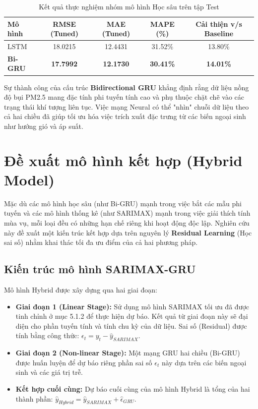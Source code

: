 \begin{table}[H]
    \centering
    \caption{Kết quả thực nghiệm nhóm mô hình Học sâu trên tập Test}
    \label{tab:dl_improvement}
    \begin{tabular}{|l|c|c|c|c|}
    \hline
    \textbf{Mô hình} & \textbf{RMSE (Tuned)} & \textbf{MAE (Tuned)} & \textbf{MAPE (\%)} & \textbf{Cải thiện v/s Baseline} \\ \hline
    LSTM             & 18.0215               & 12.4431              & 31.52\%            & 13.80\% \\
    \textbf{Bi-GRU}  & \textbf{17.7992}      & \textbf{12.1730}     & \textbf{30.41\%}   & \textbf{14.01\%} \\ \hline
    \end{tabular}
\end{table}

Sự thành công của cấu trúc \textbf{Bidirectional GRU} khẳng định rằng dữ liệu nồng độ bụi PM2.5 mang đặc tính phi tuyến tính cao và phụ thuộc chặt chẽ vào các trạng thái khí tượng liên tục. Việc mạng Neural có thể "nhìn" chuỗi dữ liệu theo cả hai chiều đã giúp tối ưu hóa việc trích xuất đặc trưng từ các biến ngoại sinh như hướng gió và áp suất.

\section{Đề xuất mô hình kết hợp (Hybrid Model)}

Mặc dù các mô hình học sâu (như Bi-GRU) mạnh trong việc bắt các mẫu phi tuyến và các mô hình thống kê (như SARIMAX) mạnh trong việc giải thích tính mùa vụ, mỗi loại đều có những hạn chế riêng khi hoạt động độc lập. Nghiên cứu này đề xuất một kiến trúc kết hợp dựa trên nguyên lý \textbf{Residual Learning} (Học sai số) nhằm khai thác tối đa ưu điểm của cả hai phương pháp.

\subsection{Kiến trúc mô hình SARIMAX-GRU}

Mô hình Hybrid được xây dựng qua hai giai đoạn:
\begin{itemize}
    \item \textbf{Giai đoạn 1 (Linear Stage):} Sử dụng mô hình SARIMAX tối ưu đã được tinh chỉnh ở mục 5.1.2 để thực hiện dự báo. Kết quả từ giai đoạn này sẽ đại diện cho phần tuyến tính và tính chu kỳ của dữ liệu. Sai số (Residual) được tính bằng công thức: $\epsilon_t = y_t - \hat{y}_{SARIMAX}$.
    \item \textbf{Giai đoạn 2 (Non-linear Stage):} Một mạng GRU hai chiều (Bi-GRU) được huấn luyện để dự báo riêng phần sai số $\epsilon_t$ này dựa trên các biến ngoại sinh và các giá trị trễ.
    \item \textbf{Kết hợp cuối cùng:} Dự báo cuối cùng của mô hình Hybrid là tổng của hai thành phần: $\hat{y}_{Hybrid} = \hat{y}_{SARIMAX} + \hat{\epsilon}_{GRU}$.
\end{itemize}

